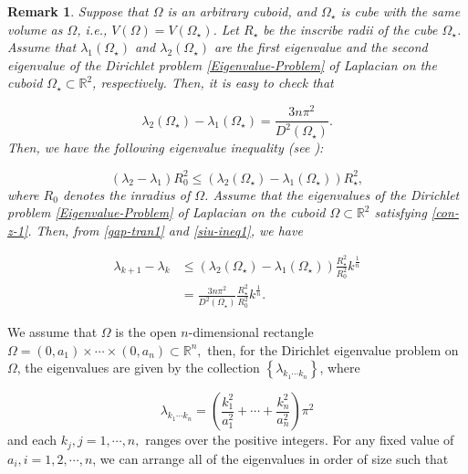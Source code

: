 \documentclass[12pt]{article}
\newtheorem{rem}[thm]{Remark}
\numberwithin{equation}{section}
\begin{document}
\begin{rem}
Suppose that $\Omega$ is an arbitrary cuboid, and $ \Omega_{\star} $ is cube with the same volume as $\Omega$, i.e.,
$V(\Omega)=V(\Omega_{\star})$. Let $R_{\star}$ be the inscribe radii of the cube $\Omega_{\star}$. Assume that $\lambda_{1}(\Omega_{\star})$ and $\lambda_{2}(\Omega_{\star})$ are the first eigenvalue and the
second eigenvalue of the Dirichlet problem \eqref{Eigenvalue-Problem} of Laplacian on the cuboid $\Omega_{\star}\subset\mathbb{R}^{2}$, respectively. Then, it is easy to check that


\begin{equation}\label{gap-tran1}\lambda_{2}(\Omega_{\star})-\lambda_{1}(\Omega_{\star})=\frac{3n\pi^{2}}{D^{2}(\Omega_{\star})}.\end{equation}
Then, we have the following eigenvalue inequality (see {\rm\cite{Siu2}}):

\begin{equation}\label{siu-ineq1} (\lambda_{2}-\lambda_{1})R^{2}_{0}\leq(\lambda_{2}(\Omega_{\star})-\lambda_{1}(\Omega_{\star}))R_{\star}^{2},\end{equation}where $R_{0}$ denotes
the inradius of $\Omega$. Assume that the eigenvalues of the Dirichlet problem \eqref{Eigenvalue-Problem} of Laplacian on the cuboid $\Omega\subset\mathbb{R}^{2}$ satisfying \eqref{con-z-1}.
Then, from \eqref{gap-tran1} and \eqref{siu-ineq1}, we have

\begin{equation}\begin{aligned}  \lambda_{k+1}-\lambda_{k}&\leq(\lambda_{2}(\Omega_{\star})-\lambda_{1}(\Omega_{\star}))\frac{R_{\star}^{2}}{R^{2}_{0}}k^{\frac{1}{n}}
\\&=\frac{3n\pi^{2}}{D^{2}(\Omega_{\star})}\frac{R_{\star}^{2}}{R^{2}_{0}}k^{\frac{1}{n}}.\end{aligned}\end{equation}
\end{rem}

We assume that  $\Omega$ is the open $n$-dimensional rectangle $\Omega= (0,a_{1})\times\cdots\times (0,a_{n})\subset \mathbb{R}^{n},$
then, for the Dirichlet  eigenvalue problem on $\Omega$, the eigenvalues are given
by the collection $\left\{\lambda_{k_{1}\cdots k_{n}}\right\}$, where


$$\lambda_{k_{1}\cdots k_{n}}=\left(\frac{k^{2}_{1}}{a_{1}^{2}}+\cdots+\frac{k^{2}_{n}}{a_{n}^{2}}\right)\pi^{2}$$
and each $k_{j},j=1,\cdots,n,$ ranges over the positive integers.  For any fixed value of $a_{i},i=1,2,\cdots,n$, we can arrange all of the eigenvalues in order of size such that
\end{document}
